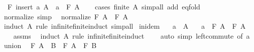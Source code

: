 \begin{isabellebody}
\ \ {\isachardoublequoteopen}F\ {\isacharparenleft}{\kern0pt}insert\ a\ A{\isacharparenright}{\kern0pt}\ {\isacharequal}{\kern0pt}\ a\ \isactrlbold {\isacharasterisk}{\kern0pt}\ F\ A{\isachardoublequoteclose}\isanewline
%
\isadelimproof
\ \ %
\endisadelimproof
%
\isatagproof
{}\isamarkupfalse%
\ {\isacharparenleft}{\kern0pt}cases\ {\isachardoublequoteopen}finite\ A{\isachardoublequoteclose}{\isacharparenright}{\kern0pt}\ {\isacharparenleft}{\kern0pt}simp{\isacharunderscore}{\kern0pt}all\ add{\isacharcolon}{\kern0pt}\ eq{\isacharunderscore}{\kern0pt}fold{\isacharparenright}{\kern0pt}%
\endisatagproof
{\isafoldproof}%
%
\isadelimproof
\isanewline
%
\endisadelimproof
\isanewline
{}\isamarkupfalse%
\ normalize\ {\isacharbrackleft}{\kern0pt}simp{\isacharbrackright}{\kern0pt}{\isacharcolon}{\kern0pt}\isanewline
\ \ {\isachardoublequoteopen}normalize\ {\isacharparenleft}{\kern0pt}F\ A{\isacharparenright}{\kern0pt}\ {\isacharequal}{\kern0pt}\ F\ A{\isachardoublequoteclose}\isanewline
%
\isadelimproof
\ \ %
\endisadelimproof
%
\isatagproof
{}\isamarkupfalse%
\ {\isacharparenleft}{\kern0pt}induct\ A\ rule{\isacharcolon}{\kern0pt}\ infinite{\isacharunderscore}{\kern0pt}finite{\isacharunderscore}{\kern0pt}induct{\isacharparenright}{\kern0pt}\ simp{\isacharunderscore}{\kern0pt}all%
\endisatagproof
{\isafoldproof}%
%
\isadelimproof
\isanewline
%
\endisadelimproof
\isanewline
{}\isamarkupfalse%
\ in{\isacharunderscore}{\kern0pt}idem{\isacharcolon}{\kern0pt}\isanewline
\ \ \ {\isachardoublequoteopen}a\ {\isasymin}\ A{\isachardoublequoteclose}\isanewline
\ \ \ {\isachardoublequoteopen}a\ \isactrlbold {\isacharasterisk}{\kern0pt}\ F\ A\ {\isacharequal}{\kern0pt}\ F\ A{\isachardoublequoteclose}\isanewline
%
\isadelimproof
\ \ %
\endisadelimproof
%
\isatagproof
{}\isamarkupfalse%
\ assms\ \isamarkupfalse%
\ {\isacharparenleft}{\kern0pt}induct\ A\ rule{\isacharcolon}{\kern0pt}\ infinite{\isacharunderscore}{\kern0pt}finite{\isacharunderscore}{\kern0pt}induct{\isacharparenright}{\kern0pt}\isanewline
\ \ \ \ {\isacharparenleft}{\kern0pt}auto\ simp{\isacharcolon}{\kern0pt}\ left{\isacharunderscore}{\kern0pt}commute\ {\isacharbrackleft}{\kern0pt}of\ a{\isacharbrackright}{\kern0pt}{\isacharparenright}{\kern0pt}%
\endisatagproof
{\isafoldproof}%
%
\isadelimproof
\isanewline
%
\endisadelimproof
\isanewline
{}\isamarkupfalse%
\ union{\isacharcolon}{\kern0pt}\isanewline
\ \ {\isachardoublequoteopen}F\ {\isacharparenleft}{\kern0pt}A\ {\isasymunion}\ B{\isacharparenright}{\kern0pt}\ {\isacharequal}{\kern0pt}\ F\ A\ \isactrlbold {\isacharasterisk}{\kern0pt}\ F\ B{\isachardoublequoteclose}\isanewline

\end{isabellebody}
